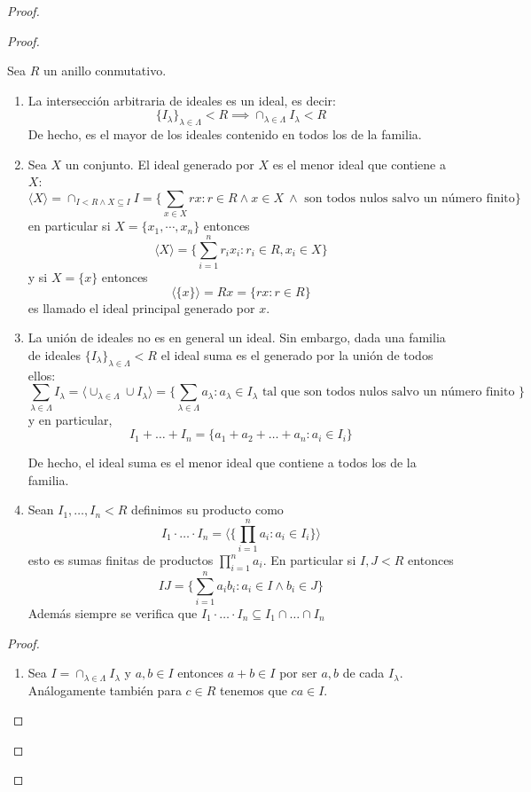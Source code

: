 \begin{proof}
\begin{proof}
\begin{proposition}
	Sea $R$ un anillo conmutativo.
	
	\begin{enumerate}
		\item La intersección arbitraria de ideales es un ideal, es decir: $$\{I_\lambda\}_{\lambda \in \Lambda} < R \implies \cap_{\lambda \in \Lambda} I_{\lambda} < R$$ De hecho, es el mayor de los ideales contenido en todos los de la familia. 
		\item Sea $X$ un conjunto. El ideal generado por $X$ es el menor ideal que contiene a $X$: $$\langle X \rangle = \cap_{I < R \land X \subseteq I} I = \{\sum_{x \in X} rx:r \in R \land x \in X\ \land \text{ son todos nulos salvo un número finito}\}$$ en particular si $X = \{x_1,\cdots,x_n\}$ entonces $$\langle X \rangle = \{\sum_{i = 1}^n r_ix_i:r_i \in R,x_i \in X\}$$ y si $X = \{x\}$ entonces $$\langle \{x\} \rangle = Rx =  \{rx:r \in R\}$$ es llamado el ideal principal generado por $x$. 
		\item La unión de ideales no es en general un ideal. Sin embargo, dada una familia de ideales $\{I_\lambda\}_{\lambda \in \Lambda} < R$ el ideal suma es el generado por la unión de todos ellos: $$\sum_{\lambda \in \Lambda} I_{\lambda} = \langle \cup_{\lambda \in \Lambda} \cup I_{\lambda} \rangle = \{\sum_{\lambda \in \Lambda} a_{\lambda}: a_{\lambda} \in I_{\lambda} \text{ tal que son todos nulos salvo un número finito }\}$$ y en particular, $$I_1 + \ldots + I_n = \{a_1+a_2+\ldots+a_n:a_i \in I_i\}$$
		
		De hecho, el ideal suma es el menor ideal que contiene a todos los de la familia. 
		\item Sean $I_1,\ldots,I_n < R$ definimos su producto como  $$I_1 \cdot \ldots \cdot I_n = \langle \{\prod_{i = 1}^n a_i:a_i \in I_i\} \rangle$$ esto es sumas finitas de productos $\prod_{i = 1}^n a_i$. En particular si $I,J < R$ entonces $$IJ = \{\sum_{i = 1}^n a_ib_i:a_i \in I \land b_i \in J\}$$ Además siempre se verifica que $I_1 \cdot \ldots \cdot I_n \subseteq I_1 \cap \ldots \cap I_n$
	\end{enumerate}
\end{proposition}
\begin{proof}
	\begin{enumerate}
		\item Sea $I = \cap_{\lambda \in \Lambda} I_\lambda$ y $a,b \in I$ entonces $a+b \in I$ por ser $a,b$ de cada $I_\lambda$. Análogamente también para $c \in R$ tenemos que $ca \in I$. 
	

\end{enumerate}
\end{proof}
\end{proof}
\end{proof}
